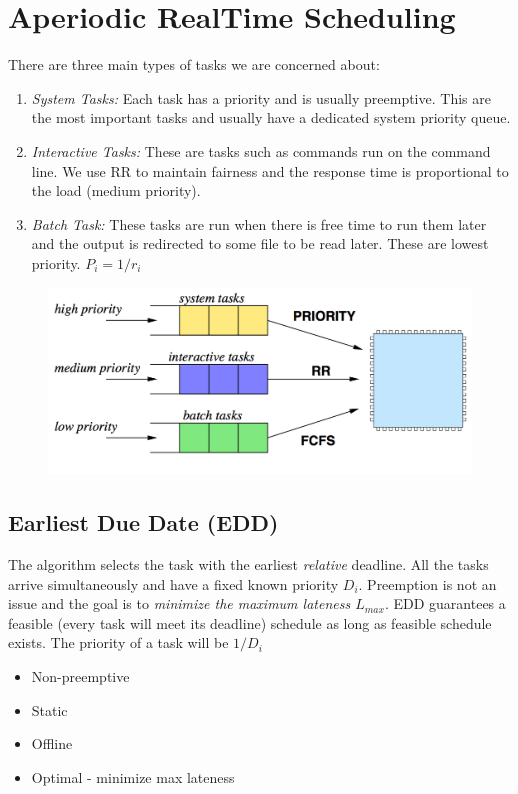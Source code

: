 \documentclass{hw}
\begin{document}
\section{Aperiodic Real\-Time Scheduling}
There are three main types of tasks we are concerned about:
\begin{enumerate}
  \item \emph{System Tasks:} Each task has a priority and is usually preemptive.
    This are the most important tasks and usually have a dedicated system 
    priority queue.
  \item \emph{Interactive Tasks:} These are tasks such as commands run on the 
    command line. We use RR to maintain fairness and the response time is 
    proportional to the load (medium priority).
  \item \emph{Batch Task:} These tasks are run when there is free time to run 
    them later and the output is redirected to some file to be read later. These
    are lowest priority. $P_{i} = 1/r_{i}$
\end{enumerate}
\begin{figure}[H]
  \centering
  \includegraphics[scale=.6]{img/tasks}
\end{figure}

\subsection{Earliest Due Date (EDD)}
The algorithm selects the task with the earliest \emph{relative} deadline. All
the tasks arrive simultaneously and have a fixed known priority $D_{i}$. 
Preemption is not an issue and the goal is to \emph{minimize the maximum 
lateness $L_{max}$}. EDD guarantees a feasible (every task will meet its deadline)
schedule as long as feasible schedule exists. The priority of a task will be 
$1/D_{i}$
\begin{itemize}
  \item Non-preemptive
  \item Static
  \item Offline
  \item Optimal - minimize max lateness
\end{itemize}
\end{document}
